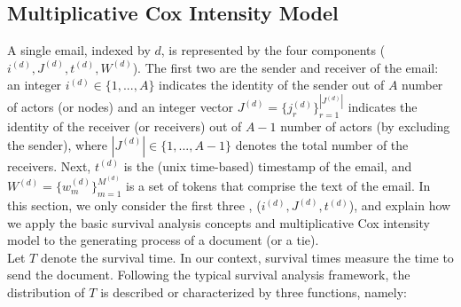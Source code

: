 \documentclass[a4paper]{article}
\begin{document}
\subsection{Multiplicative Cox Intensity Model}
A single email, indexed by $d$, is represented by the four components ($i^{(d)}, J^{(d)}, t^{(d)},  W^{(d)}$). The first two are the sender and receiver of the email: an integer $i^{(d)} \in \{1,...,A\}$ indicates the identity of the sender out of $A$ number of actors (or nodes) and an integer vector $J^{(d)} = \{j_r^{(d)}\}_{r=1}^{|J^{(d)}|} $ indicates the identity of the receiver (or receivers) out of $A-1$ number of actors (by excluding the sender), where $|J^{(d)}|\in \{1,...,A-1\}$ denotes the total number of the receivers. Next, $t^{(d)}$ is the (unix time-based) timestamp of the email, and $W^{(d)} = \{w^{(d)}_m \}_{m=1}^{M^{(d)}}$ is a set of tokens that comprise the text of the email. In this section, we only consider the first three , ($i^{(d)}, J^{(d)}, t^{(d)}$), and explain how we apply the basic survival analysis concepts and multiplicative Cox intensity model to the generating process of a document (or a tie). \\ \newline Let $T$ denote the survival time. In our context, survival times measure the time to send the document. Following the typical survival analysis framework, the distribution of $T$ is described or characterized by three functions, namely:
\end{document}
